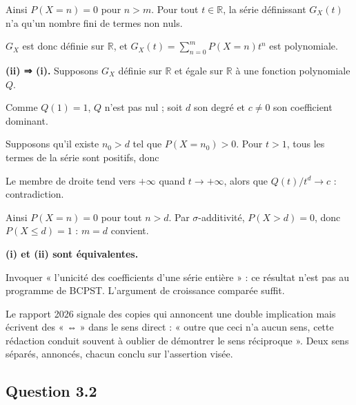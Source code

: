 \documentclass[11pt,a4paper]{article}
\newcommand{\equationajustee}[1]{%
  \sbox{\boiteequation}{$\displaystyle #1$}%
  \ifdim\wd\boiteequation>\linewidth
    \[\resizebox{\linewidth}{!}{\usebox{\boiteequation}}\]%
  \else
    \[#1\]%
  \fi}
\begin{document}
\equationajustee{\begin{aligned}
P(X=n)&\le P(X>m)\\
&=0 .
\end{aligned}}

Ainsi \(P(X=n)=0\) pour \(n>m\). Pour tout \(t\in\mathbb R\), la série définissant \(G_X(t)\) n'a qu'un nombre fini de termes non nuls.

\(G_X\) est donc définie sur \(\mathbb R\), et \(G_X(t)=\sum_{n=0}^mP(X=n)t^n\) est polynomiale.

\textbf{(ii) ⇒ (i).} Supposons \(G_X\) définie sur \(\mathbb R\) et égale sur \(\mathbb R\) à une fonction polynomiale \(Q\).

Comme \(Q(1)=1\), \(Q\) n'est pas nul ; soit \(d\) son degré et \(c\ne0\) son coefficient dominant.

Supposons qu'il existe \(n_0>d\) tel que \(P(X=n_0)>0\). Pour \(t>1\), tous les termes de la série sont positifs, donc

\equationajustee{\frac{Q(t)}{t^d}\ge P(X=n_0)\,t^{\,n_0-d}.}

Le membre de droite tend vers \(+\infty\) quand \(t\to+\infty\), alors que \(Q(t)/t^d\to c\) : contradiction.

Ainsi \(P(X=n)=0\) pour tout \(n>d\). Par \(\sigma\)-additivité, \(P(X>d)=0\), donc \(P(X\le d)=1\) : \(m=d\) convient.

\textbf{(i) et (ii) sont équivalentes.}

\begin{piege}

Invoquer « l'unicité des coefficients d'une série entière » : ce résultat n'est pas au programme de BCPST. L'argument de croissance comparée suffit.

\end{piege}

\begin{jury}

Le rapport 2026 signale des copies qui annoncent une double implication mais écrivent des « ⇔ » dans le sens direct : « outre que ceci n'a aucun sens, cette rédaction conduit souvent à oublier de démontrer le sens réciproque ». Deux sens séparés, annoncés, chacun conclu sur l'assertion visée.

\end{jury}

\hypertarget{question-3.2}{%
\subsection{Question 3.2}\label{question-3.2}}
\end{document}
